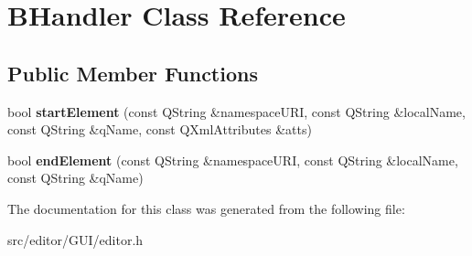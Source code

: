 \hypertarget{class_b_handler}{\section{\-B\-Handler \-Class \-Reference}
\label{class_b_handler}
}
\subsection*{\-Public \-Member \-Functions}
\begin{DoxyCompactItemize}
\item 
\hypertarget{class_b_handler_a09cd6d5d7af2ea99f9efda18bf2f275a}{bool {\bfseries start\-Element} (const \-Q\-String \&namespace\-U\-R\-I, const \-Q\-String \&local\-Name, const \-Q\-String \&q\-Name, const \-Q\-Xml\-Attributes \&atts)}\label{class_b_handler_a09cd6d5d7af2ea99f9efda18bf2f275a}

\item 
\hypertarget{class_b_handler_a62d88fdb816d386a1095d4ffd47807c8}{bool {\bfseries end\-Element} (const \-Q\-String \&namespace\-U\-R\-I, const \-Q\-String \&local\-Name, const \-Q\-String \&q\-Name)}\label{class_b_handler_a62d88fdb816d386a1095d4ffd47807c8}

\end{DoxyCompactItemize}


\-The documentation for this class was generated from the following file\-:\begin{DoxyCompactItemize}
\item 
src/editor/\-G\-U\-I/editor.\-h\end{DoxyCompactItemize}
